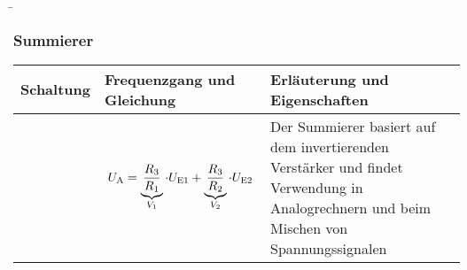 
\begin{frame}
    \b{
    \frametitle{Summierer}
    \centering
    \begin{table}[ht]
    \label{tab:Summierer}
    \begin{tabular}{|m{}|m{}|m{}|}
    \hline
    Schaltung & Frequenzgang und Gleichung & Erläuterung und Eigenschaften\\ %
    \hline
    \vspace{0.5cm}
    \centering
    

    &
    \begin{center}
    
\end{center}
\vspace{1ex}
\[
\begin{aligned}
    U_{\textnormal{A}} = \underbrace{\frac{R_3} {R_1}}_{V_1} \cdot U_{\textnormal{E1}} + \underbrace{\frac{R_3} {R_2}}_{V_2} \cdot U_{\textnormal{E2}}
\end{aligned}
\]
    & 
    Der Summierer basiert auf dem invertierenden Verstärker und findet Verwendung in Analogrechnern und beim Mischen von Spannungssignalen \\
    \hline
    \end{tabular}
    \end{table}
    }
\end{frame}

